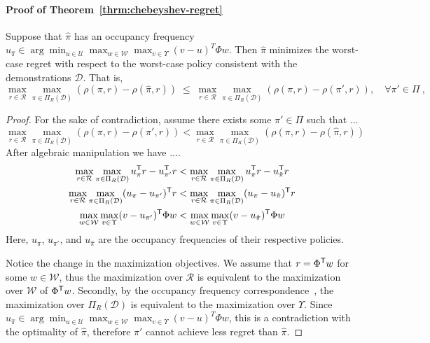 \documentclass[11pt]{article}
\begin{document}
\paragraph{Proof of Theorem~\ref{thrm:chebeyshev-regret}}
Suppose that $\hat{\pi}$ has an occupancy frequency $u_{\hat{\pi}} \in \arg\min_{u \in \mathcal{U}} \max_{w \in \mathcal{W}} \max_{v \in \Upsilon} {(v - u)}^T \Phi w$.
Then $\hat{\pi}$ minimizes the worst-case regret with respect to the worst-case
policy consistent with the demonstrations $\mathcal{D}$. That is,
\[
	\max_{r\in \mathcal{R}} \max_{\pi \in \Pi_{R}(\mathcal{D})} \left(\rho(\pi, r) - \rho(\hat{\pi}, r)\right)
	\; \le\;
	\max_{r\in \mathcal{R}} \max_{\pi \in \Pi_{R}(\mathcal{D})} \left(\rho(\pi, r) - \rho(\pi', r)\right), \quad  \forall \pi' \in \Pi~,
\]
\begin{proof}
	For the sake of contradiction,
	assume there exists some $\pi' \in \Pi$ such that $\dots$
	\[
		\max_{r\in \mathcal{R}} \max_{\pi \in \Pi_{R}(\mathcal{D})}
		\left(\rho(\pi,r) - \rho(\pi', r)\right) < \max_{r\in \mathcal{R}}
		\max_{\pi \in \Pi_{R}(\mathcal{D})}
		\left(\rho(\pi, r) - \rho(\hat{\pi}, r)\right)
	\]
	After algebraic manipulation we have $\dots$.
	\begin{align*}
		\max_{r\in \mathcal{R}} \max_{\pi \in \Pi_{R}
			(\mathcal{D})} u_{\pi}^{\mathsf{T}} r - u_{\pi'}^{\mathsf{T}} r
		 & < \max_{r\in \mathcal{R}}
		\max_{\pi \in \Pi_{R}
			(\mathcal{D})} u_{\pi}^{\mathsf{T}} r - u_{\hat{\pi}}
		^{\mathsf{T}} r                                              \\
		\max_{r\in \mathcal{R}} \max_{\pi \in \Pi_{R}(\mathcal{D})}
		(u_{\pi} - u_{\pi'})^{\mathsf{T}} r
		 & < \max_{r\in \mathcal{R}}
		\max_{\pi \in \Pi_{R}(\mathcal{D})}
		(u_{\pi} - u_{\hat{\pi}})^{\mathsf{T}} r
		\\
		\max_{w\in \mathcal{W}} \max_{v \in \Upsilon} (v - u_{\pi'})^{\mathsf{T}} \Phi w
		 & < \max_{w\in \mathcal{W}} \max_{v \in \Upsilon}
		(v - u_{\hat{\pi}})^{\mathsf{T}} \Phi w
	\end{align*}
	Here, $u_{\pi}$, $u_{\pi'}$, and $u_{\hat{\pi}}$
	are the occupancy frequencies of their respective policies.

	Notice the change in the maximization objectives.
	We assume that $r = \Phi^{\mathsf{T}} w$ for some $w \in \mathcal{W}$,
	thus the maximization over $\mathcal{R}$ is equivalent to the maximization
	over $\mathcal{W}$ of $\Phi^{\mathsf{T}} w$.
	Secondly, by the occupancy frequency correspondence~\cite{PUTERMAN}, the
	maximization over $\Pi_R(\mathcal{D})$ is equivalent to the maximization over
	$\Upsilon$.
	Since $u_{\hat{\pi}} \in \arg\min_{u \in \mathcal{U}} \max_{w \in \mathcal{W}} \max_{v \in \Upsilon} {(v - u)}^T \Phi w$,
	this is a contradiction with the optimality of $\hat{\pi}$,
	therefore $\pi'$ cannot achieve less regret than $\hat{\pi}$.
\end{proof}
\end{document}
